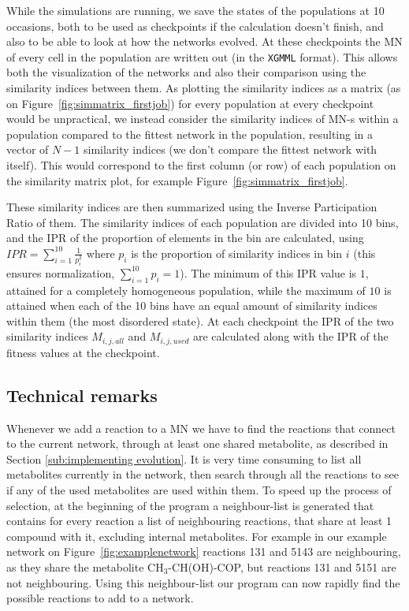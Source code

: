 \documentclass[a4paper,12pt]{article}
\begin{document}
While the simulations are running, we save the states of the populations at 10 occasions, both to be used as checkpoints if the calculation doesn't finish, and also to be able to look at how the networks evolved. At these checkpoints the MN of every cell in the population are written out (in the \texttt{XGMML} format). This allows both the visualization of the networks and also their comparison using the similarity indices between them. As plotting the similarity indices as a matrix (as on Figure~\ref{fig:simmatrix_firstjob}) for every population at every checkpoint would be unpractical, we instead consider the similarity indices of MN-s within a population compared to the fittest network in the population, resulting in a vector of $N-1$ similarity indices (we don't compare the fittest network with itself). This would correspond to the first column (or row) of each population on the similarity matrix plot, for example Figure~\ref{fig:simmatrix_firstjob}.

These similarity indices are then summarized using the Inverse Participation Ratio of them. The similarity indices of each population are divided into 10 bins, and the IPR of the proportion of elements in the bin are calculated, using $IPR= \sum^{10}_{i=1} \frac{1}{p_i^2} $ where $p_i$ is the proportion of similarity indices in bin $i$ (this ensures normalization, $ \sum^{10}_{i=1} p_i=1$). The minimum of this IPR value is $1$, attained for a completely homogeneous population, while the maximum of $10$ is attained when each of the 10 bins have an equal amount of similarity indices within them (the most disordered state).  At each checkpoint the IPR of the two similarity indices $M_{i,j,all}$ and $M_{i,j,used}$ are calculated along with the IPR of the fitness values at the checkpoint. 




\subsection{Technical remarks}
\label{sub:technical_bits}


	Whenever we add a reaction to a MN we have to find the reactions that connect to the current network, through at least one shared metabolite, as described in Section \ref{sub:implementing evolution}. It is very time consuming to list all metabolites currently in the network, then search through all the reactions to see if any of the used metabolites are used within them. To speed up the process of selection, at the beginning of the program a neighbour-list is generated that contains for every reaction a list of neighbouring reactions, that share at least 1 compound with it, excluding internal metabolites. For example in our example network on Figure~\ref{fig:examplenetwork} reactions 131 and 5143 are neighbouring, as they share the metabolite CH$_3$-CH(OH)-COP, but reactions 131 and 5151 are not neighbouring. Using this neighbour-list our program can now rapidly find the possible reactions to add to a network. 
\end{document}
